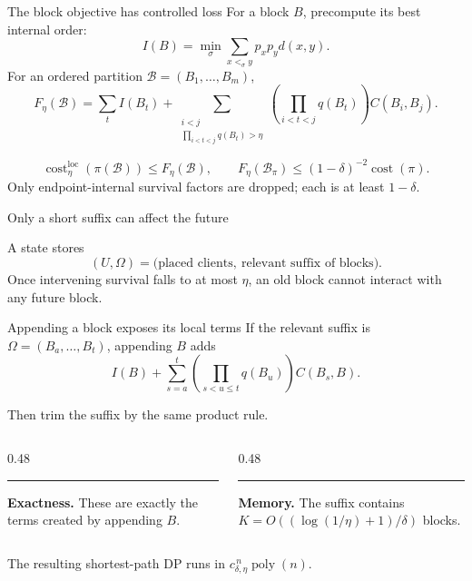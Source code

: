 \documentclass[aspectratio=169,12pt]{beamer}
\newcommand{\cost}{\operatorname{cost}}
\newcommand{\poly}{\operatorname{poly}}
\newcommand{\1}{\mathbf{1}}
\begin{document}
\begin{frame}{The block objective has controlled loss}
  For a block \(B\), precompute its best internal order:
  \[
    I(B)=\min_\sigma\sum_{x<_\sigma y}p_xp_y d(x,y).
  \]
  For an ordered partition \(\mathcal B=(B_1,\ldots,B_m)\),
  {\fontsize{11.6pt}{14pt}\selectfont
  \[
    F_\eta(\mathcal B)
    =
    \sum_t I(B_t)
    +
    \sum_{\substack{i<j\\ \prod_{i<t<j}q(B_t)>\eta}}
      \left(\prod_{i<t<j}q(B_t)\right)C(B_i,B_j).
  \]}

  \vspace{0.02cm}
  \[
    \cost^{\mathrm{loc}}_\eta(\pi(\mathcal B))
    \le F_\eta(\mathcal B),
    \qquad
    F_\eta(\mathcal B_\pi)
    \le(1-\delta)^{-2}\cost(\pi).
  \]
  \vspace{-0.08cm}
  \small Only endpoint-internal survival factors are dropped; each is at
  least \(1-\delta\).
\end{frame}

\begin{frame}{Only a short suffix can affect the future}
  \centering
  \resizebox{0.84\linewidth}{!}{\StDPSuffix}

  \vspace{0.04cm}
  A state stores
  \[
    (U,\Omega)
    =
    \bigl(\text{placed clients},\ \text{relevant suffix of blocks}\bigr).
  \]
  \small Once intervening survival falls to at most \(\eta\), an old block
  cannot interact with any future block.
\end{frame}

\begin{frame}{Appending a block exposes its local terms}
  If the relevant suffix is
  \(\Omega=(B_a,\ldots,B_t)\), appending \(B\) adds
  \[
    I(B)
    +
    \sum_{s=a}^{t}
      \left(\prod_{s<u\le t}q(B_u)\right)C(B_s,B).
  \]

  \vspace{0.08cm}
  Then trim the suffix by the same product rule.

  \vspace{0.10cm}
  \begin{columns}[T,onlytextwidth]
    \begin{column}{0.48\textwidth}
      {\color{STBlue}\rule{3pt}{2.3em}}\hspace{0.35em}%
      \parbox[c]{0.88\linewidth}{\textbf{Exactness.} These are exactly the
      terms created by appending \(B\).}
    \end{column}
    \begin{column}{0.48\textwidth}
      {\color{STTeal}\rule{3pt}{2.3em}}\hspace{0.35em}%
      \parbox[c]{0.88\linewidth}{\textbf{Memory.} The suffix contains
      \(K=O((\log(1/\eta)+1)/\delta)\) blocks.}
    \end{column}
  \end{columns}

  \vspace{0.10cm}
  The resulting shortest-path DP runs in
  \(c_{\delta,\eta}^{\,n}\poly(n)\).
\end{frame}
\end{document}

